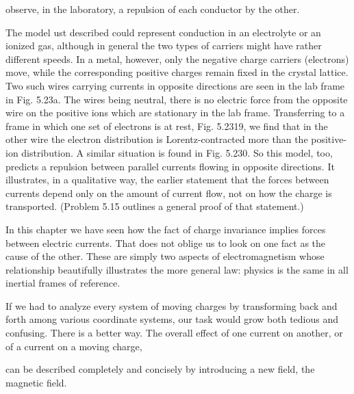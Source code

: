 observe, in the laboratory, a repulsion of each conductor by the
other.

The model ust described could represent conduction in an electrolyte
or an ionized gas, although in general the two types of carriers
might have rather different speeds. In a metal, however, only the
negative charge carriers (electrons) move, while the corresponding
positive charges remain fixed in the crystal lattice. Two such wires
carrying currents in opposite directions are seen in the lab frame in
Fig. 5.23a. The wires being neutral, there is no electric force from
the opposite wire on the positive ions which are stationary in the lab
frame. Transferring to a frame in which one set of electrons is at
rest, Fig. 5.2319, we find that in the other wire the electron distribution
is Lorentz-contracted more than the positive-ion distribution. A
similar situation is found in Fig. 5.230. So this model, too, predicts
a repulsion between parallel currents flowing in opposite directions.
It illustrates, in a qualitative way, the earlier statement that the forces
between currents depend only on the amount of current flow, not on
how the charge is transported. (Problem 5.15 outlines a general
proof of that statement.)

In this chapter we have seen how the fact of charge invariance implies
forces between electric currents. That does not oblige us to
look on one fact as the cause of the other. These are simply two
aspects of electromagnetism whose relationship beautifully illustrates
the more general law: physics is the same in all inertial frames
of reference.

If we had to analyze every system of moving charges by transforming
back and forth among various coordinate systems, our task would
grow both tedious and confusing. There is a better way. The overall
effect of one current on another, or of a current on a moving charge,

can be described completely and concisely by introducing a new field,
the magnetic field.

\fi
